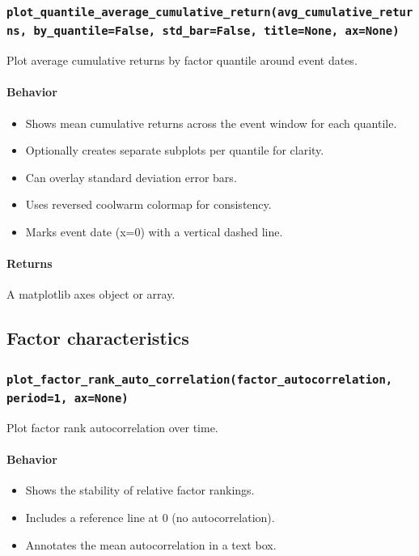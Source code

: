 \documentclass[11pt]{article}
\begin{document}
\subsubsection{\texttt{plot\_quantile\_average\_cumulative\_return(avg\_cumulative\_returns, by\_quantile=False, std\_bar=False, title=None, ax=None)}}
Plot average cumulative returns by factor quantile around event dates.

\paragraph{Behavior}
\begin{itemize}
  \item Shows mean cumulative returns across the event window for each quantile.
  \item Optionally creates separate subplots per quantile for clarity.
  \item Can overlay standard deviation error bars.
  \item Uses reversed coolwarm colormap for consistency.
  \item Marks event date (x=0) with a vertical dashed line.
\end{itemize}

\paragraph{Returns}
A matplotlib axes object or array.

\subsection{Factor characteristics}

\subsubsection{\texttt{plot\_factor\_rank\_auto\_correlation(factor\_autocorrelation, period=1, ax=None)}}
Plot factor rank autocorrelation over time.

\paragraph{Behavior}
\begin{itemize}
  \item Shows the stability of relative factor rankings.
  \item Includes a reference line at 0 (no autocorrelation).
  \item Annotates the mean autocorrelation in a text box.
\end{itemize}
\end{document}
